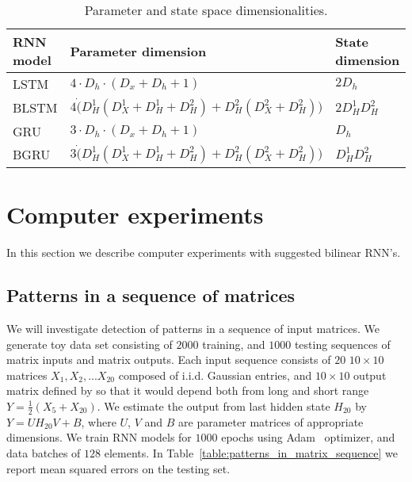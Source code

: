 \documentclass[a4paper,11pt]{article}
\begin{document}
\begin{table}
\begin{tabular}{ |l|l|l| }
  \hline
   RNN model & Parameter dimension & State dimension \\
  \hline   
   LSTM & $ 4 \cdot D_{h} \cdot (D_{x}  + D_{h} + 1)$  & $2D_{h}$ \\
  \hline   
   BLSTM & 	$4 \dot ( D_{H}^{1} (D_{X}^{1} + D_{H}^{1} + D_{H}^{2}) + D_{H}^{2} (D_{X}^{2} + D_{H}^{2}))$ & $2 D_{H}^{1} D_{H}^{2}$\\
  \hline   
   GRU & $ 3 \cdot D_{h} \cdot (D_{x}  + D_{h} + 1) $ & $D_{h}$ \\      
  \hline   
   BGRU & 	$3 \dot ( D_{H}^{1} (D_{X}^{1} + D_{H}^{1} + D_{H}^{2}) + D_{H}^{2} (D_{X}^{2} + D_{H}^{2}))$ & $ D_{H}^{1} D_{H}^{2}$\\
  \hline
\end{tabular}
  \caption{Parameter and state space dimensionalities.}
\label{table:parameters_and_states}
\end{table}




\section{Computer experiments}

In this section we describe computer experiments with suggested bilinear RNN's.

\subsection{Patterns in a sequence of matrices}

We will investigate detection of patterns in a sequence of input matrices. We generate toy data set consisting of $2000$ training, and $1000$ testing 
sequences of matrix inputs and matrix outputs. Each input sequence consists of $20$
$10 \times 10$ matrices $X_{1}, X_{2}, ... X_{20}$ composed of i.i.d. Gaussian entries, and $10 \times 10$ output matrix defined by so that it would depend both from long and short range $Y =  \frac{1}{2} (X_{5} + X_{20})$. We estimate the output from last hidden state $H_{20}$ by $Y = UH_{20}V + B$, where $U$, $V$ and $B$ are parameter matrices of appropriate dimensions. We train RNN models for $1000$ epochs using Adam~\cite{Kingma} optimizer, and data batches of $128$ elements. In Table~\ref{table:patterns_in_matrix_sequence} we report mean squared errors on the testing set.
\end{document}

